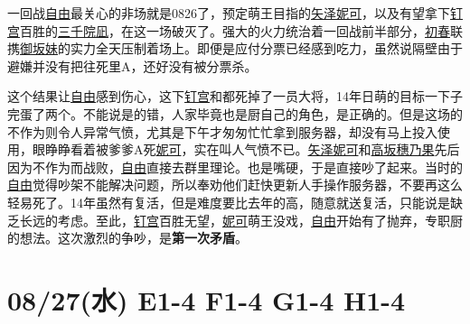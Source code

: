 
一回战\uline{自由}最关心的非场就是0826了，预定萌王目指的\uline{矢泽妮可}，以及有望拿下\uline{钉宫}百胜的\uline{三千院凪}，在这一场破灭了。强大的火力统治着一回战前半部分，\uline{初春}联携\uline{御坂妹}的实力全天压制着场上。即便是应付分票已经感到吃力，虽然说隔壁由于避嫌并没有把往死里A，还好没有被分票杀。

这个结果让\uline{自由}感到伤心，这下\uline{钉宫}和都死掉了一员大将，14年日萌的目标一下子完蛋了两个。不能说是的错，人家毕竟也是厨自己的角色，是正确的。但是这场的不作为则令人异常气愤，尤其是下午才匆匆忙忙拿到服务器，却没有马上投入使用，眼睁睁看着被爹爹A死\uline{妮可}，实在叫人气愤不已。\uline{矢泽妮可}和\uline{高坂穗乃果}先后因为不作为而战败，\uline{自由}直接去群里理论。也是嘴硬，于是直接吵了起来。当时的\uline{自由}觉得吵架不能解决问题，所以奉劝他们赶快更新人手操作服务器，不要再这么轻易死了。14年虽然有复活，但是难度要比去年的高，随意就送复活，只能说是缺乏长远的考虑。至此，\uline{钉宫}百胜无望，\uline{妮可}萌王没戏，\uline{自由}开始有了抛弃，专职厨的想法。这次激烈的争吵，是\textbf{第一次矛盾}。

\section{08/27(水) E1-4 F1-4 G1-4 H1-4}


